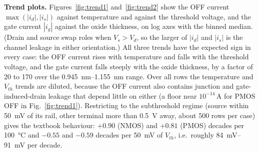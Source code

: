 \textbf{Trend plots.} Figures~\ref{fig:trend1} and~\ref{fig:trend2} show the OFF current $\max(|i_d|,|i_s|)$ against temperature and against the threshold voltage, and the gate current $|i_g|$ against the oxide thickness, on log axes with the binned median. (Drain and source swap roles when $V_s>V_d$, so the larger of $|i_d|$ and $|i_s|$ is the channel leakage in either orientation.) All three trends have the expected sign in every case: the OFF current rises with temperature and falls with the threshold voltage, and the gate current falls steeply with the oxide thickness, by a factor of 20 to 170 over the \SIrange{0.945}{1.155}{\nano\meter} range.
Over all rows the temperature and $V_{th}$ trends are diluted, because the OFF current also contains junction and gate-induced-drain leakage that depend little on either (a floor near $10^{-14}$\,\si{\ampere} for PMOS OFF in Fig.~\ref{fig:trend1}). Restricting to the subthreshold regime (source within \SI{50}{\milli\volt} of its rail, other terminal more than \SI{0.5}{\volt} away, about 500 rows per case) gives the textbook behaviour: $+0.90$ (NMOS) and $+0.81$ (PMOS) decades per \SI{100}{\celsius} and $-0.55$ and $-0.59$ decades per \SI{50}{\milli\volt} of $V_{th}$, i.e.\ roughly \SIrange{84}{91}{\milli\volt} per decade.
\begin{table}[t]
\caption{Model comparison on the validation set (80:10:10). $R^2$ is computed on $\log_{10}|I|$ per current and averaged; median and 95th percentile are relative errors in \%, averaged over $i_d,i_g,i_s,i_b$. Bold: model chosen by the lowest mean median error.}
\label{tab:modelcomp}
\centering\footnotesize

\end{table}
\begin{table}[t]
\caption{Chosen models on the test set: median and 95th-percentile relative error (\%) per current.}
\label{tab:chosen}
\centering\footnotesize

\end{table}
